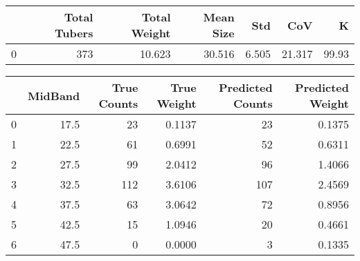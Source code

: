 \begin{tabular}{lrrrrrr}
\toprule
{} &  Total Tubers &  Total Weight &  Mean Size &    Std &     CoV &      K \\
\midrule
0 &           373 &        10.623 &     30.516 &  6.505 &  21.317 &  99.93 \\
\bottomrule
\end{tabular}

\begin{tabular}{lrrrrr}
\toprule
{} &  MidBand &  True Counts &  True Weight &  Predicted Counts &  Predicted Weight \\
\midrule
0 &     17.5 &           23 &       0.1137 &                23 &            0.1375 \\
1 &     22.5 &           61 &       0.6991 &                52 &            0.6311 \\
2 &     27.5 &           99 &       2.0412 &                96 &            1.4066 \\
3 &     32.5 &          112 &       3.6106 &               107 &            2.4569 \\
4 &     37.5 &           63 &       3.0642 &                72 &            0.8956 \\
5 &     42.5 &           15 &       1.0946 &                20 &            0.4661 \\
6 &     47.5 &            0 &       0.0000 &                 3 &            0.1335 \\
\bottomrule
\end{tabular}


